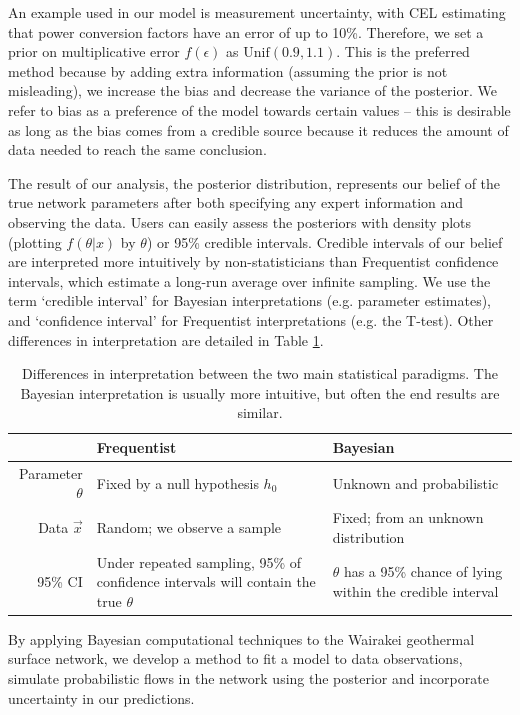 \documentclass[a4paper, 12pt]{article}
\begin{document}
An example used in our model is measurement uncertainty, with CEL estimating that power conversion factors have an error of up to 10\%. Therefore, we set a prior on multiplicative error $f(\epsilon)$ as $\text{Unif}(0.9,1.1)$. This is the preferred method because by adding extra information (assuming the prior is not misleading), we increase the bias and decrease the variance of the posterior. We refer to bias as a preference of the model towards certain values -- this is desirable as long as the bias comes from a credible source because it reduces the amount of data needed to reach the same conclusion.

The result of our analysis, the posterior distribution, represents our belief of the true network parameters after both specifying any expert information and observing the data. Users can easily assess the posteriors with density plots (plotting $f(\theta|x)$ by $\theta$) or 95\% credible intervals. Credible intervals of our belief are interpreted more intuitively by non-statisticians than Frequentist confidence intervals, which estimate a long-run average over infinite sampling. We use the term `credible interval' for Bayesian interpretations (e.g. parameter estimates), and `confidence interval' for Frequentist interpretations (e.g. the T-test). Other differences in interpretation are detailed in Table \ref{tab:ci}.

\begin{table}
\centering
\begin{tabularx}{0.85\linewidth}{rXX}
\hline
 & Frequentist & Bayesian \\ 
  \hline
Parameter $\theta$ & Fixed by a null hypothesis $h_0$ & Unknown and probabilistic \\\hline
Data $\vec{x}$ & Random; we observe a sample & Fixed; from an unknown distribution \\\hline
95\% CI & Under repeated sampling, 95\% of confidence intervals will contain the true $\theta$ & $\theta$ has a 95\% chance of lying within the credible interval  \\
   \hline
\end{tabularx}
\caption{Differences in interpretation between the two main statistical paradigms. The Bayesian interpretation is usually more intuitive, but often the end results are similar.}
\label{tab:ci}
\end{table}

By applying Bayesian computational techniques to the Wairakei geothermal surface network, we develop a  method to fit a model to data observations, simulate probabilistic flows in the network using the posterior and incorporate uncertainty in our predictions.
\end{document}
